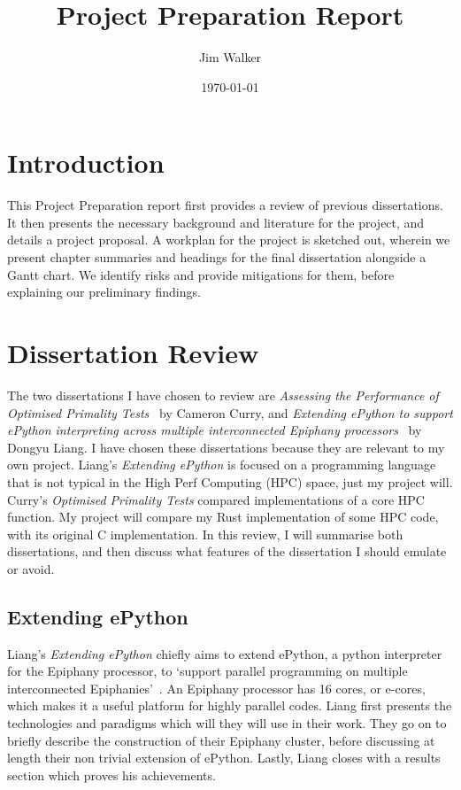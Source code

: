 \documentclass{report}
\begin{document}
\title{Project Preparation Report}
\author{Jim Walker}
\date{\today}

\makeEPCCtitle

\thispagestyle{empty}

\pagebreak
\tableofcontents
\pagebreak

\chapter{Introduction}
This Project Preparation report first provides a review of previous dissertations. It then presents the necessary background and literature for the project, and details a project proposal. A workplan for the project is sketched out, wherein we present chapter summaries and headings for the final dissertation alongside a Gantt chart. We identify risks and provide mitigations for them, before explaining our preliminary findings.
\chapter{Dissertation Review}
The two dissertations I have chosen to review are \textit{Assessing the Performance of Optimised Primality Tests}~\cite{Curry2016} by Cameron Curry, and \textit{Extending ePython to support ePython interpreting across multiple interconnected Epiphany processors}~\cite{Liang2017} by Dongyu Liang. I have chosen these dissertations because they are relevant to my own project. Liang's \textit{Extending ePython} is focused on a programming language that is not typical in the High Perf Computing (HPC) space, just my project will. Curry's \textit{Optimised Primality Tests} compared implementations of a core HPC function. My project will compare my Rust implementation of some HPC code, with its original C implementation. In this review, I will summarise both dissertations, and then discuss what features of the dissertation I should emulate or avoid.
\section{Extending ePython}
Liang's \textit{Extending ePython} chiefly aims to extend ePython, a python interpreter for the Epiphany processor, to `support parallel programming on multiple interconnected Epiphanies'~\cite{Liang2017}. An Epiphany processor has 16 cores, or e-cores, which makes it a useful platform for highly parallel codes. Liang first presents the technologies and paradigms which will they will use in their work. They go on to briefly describe the construction of their Epiphany cluster, before discussing at length their non trivial extension of ePython. Lastly, Liang closes with a results section which proves his achievements.
\end{document}
